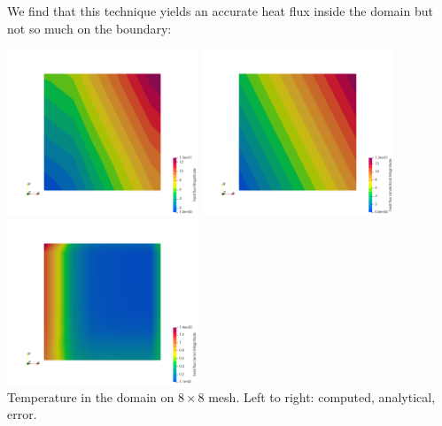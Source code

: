 We find that this technique yields an accurate heat flux inside the domain 
but not so much on the boundary:

\begin{center}
\includegraphics[width=5.7cm]{python_codes/fieldstone_173/results/exp1/q8}
\includegraphics[width=5.7cm]{python_codes/fieldstone_173/results/exp1/q8_analytical}
\includegraphics[width=5.7cm]{python_codes/fieldstone_173/results/exp1/q8_error}\\
{\captionfont Temperature in the domain on $8 \times 8$ mesh. Left to right:
computed, analytical, error.}
\end{center}

